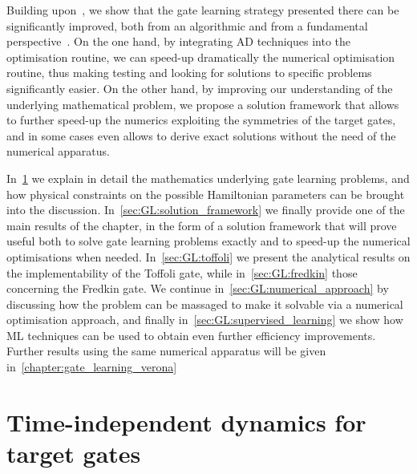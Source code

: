 Building upon~\cite{banchi2016quantum}, we show that the gate learning strategy presented there can be significantly improved, both from an algorithmic and from a fundamental perspective~\cite{innocenti2018supervised}.
On the one hand, by integrating \ac{AD} techniques into the optimisation routine, we can speed-up dramatically the numerical optimisation routine, thus making testing and looking for solutions to specific problems significantly easier.
On the other hand, by improving our understanding of the underlying mathematical problem, we propose a solution framework that allows to further speed-up the numerics exploiting the symmetries of the target gates, and in some cases even allows to derive exact solutions without the need of the numerical apparatus.

In~\cref{sec:GL:problem_details} we explain in detail the mathematics underlying gate learning problems, and how physical constraints on the possible Hamiltonian parameters can be brought into the discussion. In~\cref{sec:GL:solution_framework} we finally provide one of the main results of the chapter, in the form of a solution framework that will prove useful both to solve gate learning problems exactly and to speed-up the numerical optimisations when needed. In~\cref{sec:GL:toffoli} we present the analytical results on the implementability of the Toffoli gate, while in~\cref{sec:GL:fredkin} those concerning the Fredkin gate. We continue in~\cref{sec:GL:numerical_approach} by discussing how the problem can be massaged to make it solvable via a numerical optimisation approach, and finally in~\cref{sec:GL:supervised_learning} we show how \ac{ML} techniques can be used to obtain even further efficiency improvements.
Further results using the same numerical apparatus will be given in~\cref{chapter:gate_learning_verona}


\section{Time-independent dynamics for target gates}
\label{sec:GL:problem_details}

\newcommand{\setOfHamiltonians}{\calH[\bullet]}

